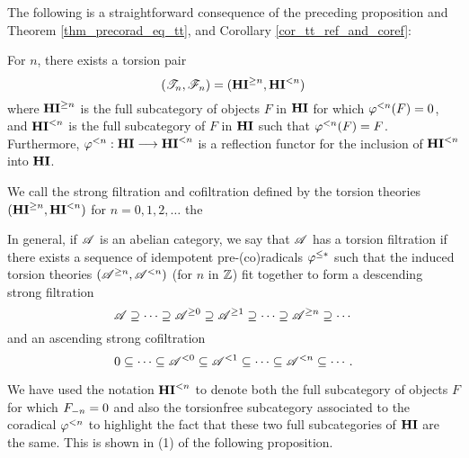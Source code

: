 The following is a straightforward consequence of the preceding 
proposition and Theorem \ref{thm_precorad_eq_tt}, and Corollary
\ref{cor_tt_ref_and_coref}:

\begin{cor}\label{cor_tlHI_prop}
For $n$, there exists a torsion pair 
\[
(\Cat{T}_n, \Cat{F}_n) = (\TGHI{n}{\HI}, \TLHI{n}{\HI})
\] 
where $\TGHI{n}{\HI}$ is the full subcategory of objects $F$ in 
$\HI$ for which $\tlHI{n}(F) = 0$, and $\TLHI{n}{\HI}$ is the full 
subcategory of $F$ in $\HI$ such that $\tlHI{n}(F) = F$. 
Furthermore, $\tlHI{n} : \HI \to \TLHI{n}{\HI}$ is a reflection 
functor for the inclusion of $\TLHI{n}{\HI}$ into $\HI$.
\end{cor}

\begin{defn}
We call the strong filtration and cofiltration defined by
the torsion theories $(\TGHI{n}{\HI}, \TLHI{n}{\HI})$ for $n = 
0,1,2,\dots$ the 

In general, if $\Cat{A}$ is an abelian category, we say that
$\Cat{A}$ has a torsion filtration if there exists a sequence
of idempotent pre-(co)radicals $\corad{*}$ such that the induced
torsion theories $(\Prerad{n}{\Cat{A}}, \Corad{n}{\Cat{A}})$ (for 
$n$ in $\Z$) fit together to form a descending strong filtration
\[
\Cat{A} \supseteq \cdots \supseteq \Prerad{0}{\Cat{A}} \supseteq
   \Prerad{1}{\Cat{A}} \supseteq \cdots \supseteq \Prerad{n}{\Cat{A}}
   \supseteq \cdots
\]
and an ascending strong cofiltration
\[
0 \subseteq \cdots \subseteq \Corad{0}{\Cat{A}} \subseteq
   \Corad{1}{\Cat{A}} \subseteq \cdots \subseteq \Corad{n}{\Cat{A}}
   \subseteq \cdots.
\]
\end{defn}

\begin{rmk}
We have used the notation $\TLHI{n}{\HI}$ to denote both the full
subcategory of objects $F$ for which $\RHI[n]{F} = 0$ and also
the torsionfree subcategory associated to the coradical $\tlHI{n}$
to highlight the fact that these two full subcategories of $\HI$
are the same. This is shown in (1) of the following proposition.
\end{rmk}

